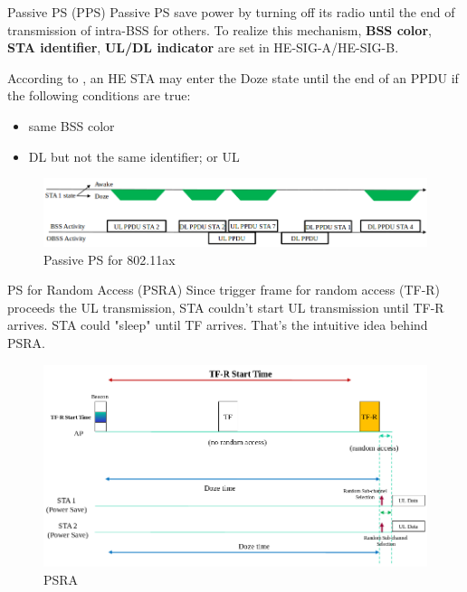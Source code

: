 \documentclass[10pt]{beamer}
\begin{document}
\begin{frame}{Passive PS (PPS)}
Passive PS save power by turning off its radio until the end of transmission of intra-BSS for others.  
To realize this mechanism, \textbf{BSS color}, \textbf{STA identifier}, \textbf{UL/DL indicator} are set in HE-SIG-A/HE-SIG-B.

According to \cite{pps}, an HE STA may enter the Doze state until the end of an PPDU if the following conditions are true:
\begin{itemize}
\item
same BSS color
\item 
DL but not the same identifier; or UL
\end{itemize}
\begin{figure}
\includegraphics[scale=0.3]{./figure/pps.png}
\caption{Passive PS for 802.11ax\cite{pps}}
\label{pps}
\end{figure}
\end{frame}

\begin{frame}{PS for Random Access (PSRA)}
Since trigger frame for random access (TF-R) proceeds the UL transmission, STA couldn't start UL transmission until TF-R arrives. 
STA could "sleep" until TF arrives. That's the intuitive idea behind PSRA. 
\begin{figure}
\includegraphics[scale=0.34]{./figure/psra.png}
\caption{PSRA\cite{psra}}
\label{psra}
\end{figure}
\end{frame}
\end{document}
